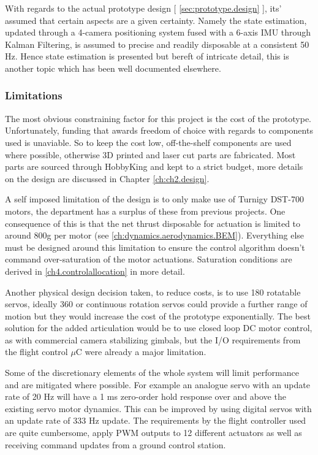 \par
With regards to the actual prototype design [ \ref{sec:prototype.design} ], its' assumed that certain aspects are a given certainty. Namely the state estimation, updated through a 4-camera positioning system fused with a 6-axis IMU through Kalman Filtering, is assumed to precise and readily disposable at a consistent 50 Hz. Hence state estimation is presented but bereft of intricate detail, this is another topic which has been well documented elsewhere.
\subsubsection{Limitations}
\label{subsubsec:intro.foreward.limits}
The most obvious constraining factor for this project is the cost of the prototype. Unfortunately, funding that awards freedom of choice with regards to components used is unaviable. So to keep the cost low, off-the-shelf components are used where possible, otherwise 3D printed and laser cut parts are fabricated. Most parts are sourced through HobbyKing \cite{hobbyking} and kept to a strict budget, more details on the design are discussed in Chapter \ref{ch:ch2.design}.
\par
A self imposed limitation of the design is to only make use of Turnigy DST-700 motors, the department has a surplus of these from previous projects. One consequence of this is that the net thrust disposable for actuation is limited to around 800g per motor (see \ref{ch:dynamics.aerodynamics.BEM}). Everything else must be designed around this limitation to ensure the control algorithm doesn't command over-saturation of the motor actuations. Saturation conditions are derived in \ref{ch4.controlallocation} in more detail.
\par
Another physical design decision taken, to reduce costs, is to use 180 \textdegree rotatable servos, ideally 360 \textdegree or continuous rotation servos could provide a further range of motion but they would increase the cost of the prototype exponentially. The best solution for the added articulation would be to use closed loop DC motor control, as with commercial camera stabilizing gimbals, but the I/O requirements from the flight control $\mu$C were already a major limitation.
\par
Some of the discretionary elements of the whole system will limit performance and are mitigated where possible. For example an analogue servo with an update rate of 20 Hz will have a 1 ms zero-order hold response over and above the existing servo motor dynamics. This can be improved by using digital servos with an update rate of 333 Hz update. The requirements by the flight controller used are quite cumbersome, apply PWM outputs to 12 different actuators as well as receiving command updates from a ground control station. 
